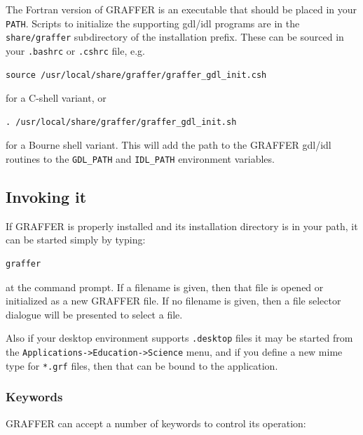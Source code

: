 \documentclass[11pt,twoside,english]{article}
\begin{document}
The Fortran version of GRAFFER is an executable that should be placed
in your \texttt{PATH}. Scripts to initialize the supporting gdl/idl
programs are in the \texttt{share/graffer} subdirectory of the
installation prefix. These can be sourced in your \texttt{.bashrc} or
\texttt{.cshrc} file, e.g.
\begin{verbatim}
source /usr/local/share/graffer/graffer_gdl_init.csh
\end{verbatim}
for a C-shell variant, or
\begin{verbatim}
. /usr/local/share/graffer/graffer_gdl_init.sh
\end{verbatim}
for a Bourne shell variant. This will add the path to the GRAFFER
gdl/idl routines to the \texttt{GDL\_PATH} and \texttt{IDL\_PATH}
environment variables.

\subsection{Invoking it}

If GRAFFER is properly installed and its installation directory is in
your path, it can be started simply by typing:
\begin{verbatim}
graffer
\end{verbatim}
at the command prompt. If a filename is given, then that file is opened
or initialized as a new GRAFFER file. If no filename is given, then a
file selector dialogue will be presented to select a file.

Also if your desktop environment supports \texttt{.desktop} files it
may be started from the \texttt{Applications->Education->Science} menu,
and if you define a new mime type for \texttt{*.grf} files, then that
can be bound to the application.

\subsubsection{Keywords}

GRAFFER can accept a number of keywords to control its operation:
\end{document}
